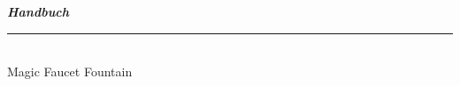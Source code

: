%
%
%

\begin{titlepage}
    
    
    \begin{flushright}
        \vspace{2cm}
        \LARGE \textsl{\textbf{Handbuch}}\\
        \rule{0.6\textwidth}{0.4pt} ~\\
        \vspace{0.5cm}
        \textsf{\LARGE Magic Faucet Fountain}\\
    \end{flushright}
    
    \vspace{3cm}
    \large


\end{titlepage}
